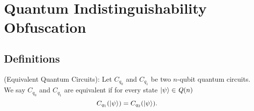 
\section{Quantum Indistinguishability Obfuscation}
\label{sec:QiO-Cliffords and more}


\subsection{Definitions}
\label{sec:iO-Cliffords and more}
\begin{definition} {\rm (Equivalent Quantum Circuits):}
\label{def:eqcircuit}
Let $C_{q_0}$ and $C_{q_1}$ be two $n$-qubit quantum circuits. We say $C_{q_0}$ and $C_{q_1}$ are equivalent if for every state ${\lvert}\psi\rangle\in\mathit{Q}(n)$
$$C_{q_1}({\lvert}\psi\rangle) =C_{q_2}({\lvert}\psi\rangle).$$
\end{definition}

